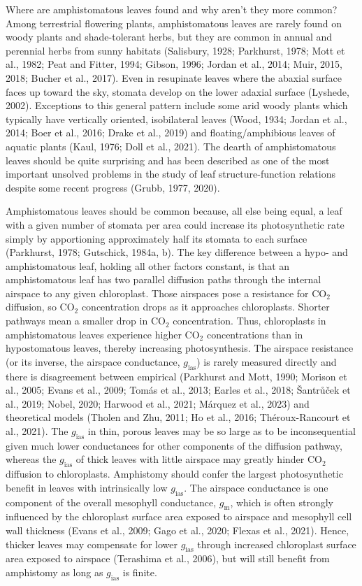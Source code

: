\documentclass[
  letterpaper,
  DIV=11,
  numbers=noendperiod]{scrartcl}
\begin{document}
Where are amphistomatous leaves found and why aren't they more common?
Among terrestrial flowering plants, amphistomatous leaves are rarely
found on woody plants and shade-tolerant herbs, but they are common in
annual and perennial herbs from sunny habitats (Salisbury, 1928;
Parkhurst, 1978; Mott et al., 1982; Peat and Fitter, 1994; Gibson, 1996;
Jordan et al., 2014; Muir, 2015, 2018; Bucher et al., 2017). Even in
resupinate leaves where the abaxial surface faces up toward the sky,
stomata develop on the lower adaxial surface (Lyshede, 2002). Exceptions
to this general pattern include some arid woody plants which typically
have vertically oriented, isobilateral leaves (Wood, 1934; Jordan et
al., 2014; Boer et al., 2016; Drake et al., 2019) and
floating/amphibious leaves of aquatic plants (Kaul, 1976; Doll et al.,
2021). The dearth of amphistomatous leaves should be quite surprising
and has been described as one of the most important unsolved problems in
the study of leaf structure-function relations despite some recent
progress (Grubb, 1977, 2020).

Amphistomatous leaves should be common because, all else being equal, a
leaf with a given number of stomata per area could increase its
photosynthetic rate simply by apportioning approximately half its
stomata to each surface (Parkhurst, 1978; Gutschick, 1984a, b). The key
difference between a hypo- and amphistomatous leaf, holding all other
factors constant, is that an amphistomatous leaf has two parallel
diffusion paths through the internal airspace to any given chloroplast.
Those airspaces pose a resistance for CO\(_2\) diffusion, so CO\(_2\)
concentration drops as it approaches chloroplasts. Shorter pathways mean
a smaller drop in CO\(_2\) concentration. Thus, chloroplasts in
amphistomatous leaves experience higher CO\(_2\) concentrations than in
hypostomatous leaves, thereby increasing photosynthesis. The airspace
resistance (or its inverse, the airspace conductance,
\(g_\mathrm{ias}\)) is rarely measured directly and there is
disagreement between empirical (Parkhurst and Mott, 1990; Morison et
al., 2005; Evans et al., 2009; Tomás et al., 2013; Earles et al., 2018;
Šantrůček et al., 2019; Nobel, 2020; Harwood et al., 2021; Márquez et
al., 2023) and theoretical models (Tholen and Zhu, 2011; Ho et al.,
2016; Théroux-Rancourt et al., 2021). The \(g_\mathrm{ias}\) in thin,
porous leaves may be so large as to be inconsequential given much lower
conductances for other components of the diffusion pathway, whereas the
\(g_\mathrm{ias}\) of thick leaves with little airspace may greatly
hinder CO\(_2\) diffusion to chloroplasts. Amphistomy should confer the
largest photosynthetic benefit in leaves with intrinsically low
\(g_\mathrm{ias}\). The airspace conductance is one component of the
overall mesophyll conductance, \(g_\mathrm{m}\), which is often strongly
influenced by the chloroplast surface area exposed to airspace and
mesophyll cell wall thickness (Evans et al., 2009; Gago et al., 2020;
Flexas et al., 2021). Hence, thicker leaves may compensate for lower
\(g_\mathrm{ias}\) through increased chloroplast surface area exposed to
airspace (Terashima et al., 2006), but will still benefit from
amphistomy as long as \(g_\mathrm{ias}\) is finite.
\end{document}
